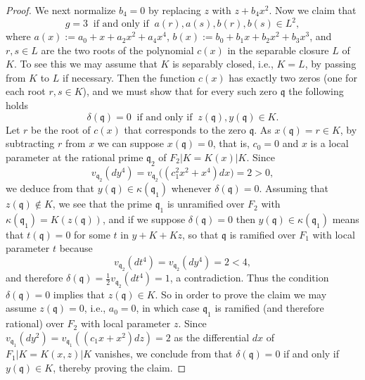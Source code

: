 \documentclass[12pt,reqno]{amsart}
\newcommand{\todoo}[2][]{\todo[size=tiny, #1]{#2}} %
\theoremstyle{definition}
\newcommand{\pp}{\mathfrak{p}}
\newcommand{\fq}{\mathfrak{q}}
\newcommand{\de}{\delta}
\newcommand{\ka}{\kappa}
\begin{document}
\begin{proof}



We next normalize $b_4=0$ by replacing $z$ with $z+ b_4 x^2$. 
Now we claim that
\[ g=3 \ \text{ if and only if } \ a(r),a(s),b(r),b(s)\in L^2,\]
where $a(x) := a_0 + x + a_2 x^2 + a_4 x^4$, $b(x) := b_0 + b_1 x + b_2 x^2 + b_3 x^3$, and $r,s \in L$ are the two roots of the polynomial $c(x)$ in the separable closure $L$ of $K$.
To see this we may assume that $K$ is separably closed, i.e., $K=L$, by passing from $K$ to $L$ if necessary.
Then the function $c(x)$ has exactly two zeros (one for each root $r,s \in K$), and we must show that for every such zero $\fq$ the following holds
\[ \de(\fq)=0 \ \text{ if and only if } \ z(\fq),y(\fq)\in K. \]
Let $r$ be the root of $c(x)$ that corresponds to the zero $\fq$.
As $x(\fq) = r \in K$, by subtracting $r$ from $x$ we can suppose $x(\fq)=0$,
that is, $c_0 = 0$ and $x$ is a local parameter at the rational prime $\fq_2$ of $F_2|K=K(x)|K$.
Since 
\[ v_{\fq_2}(d y^4) = v_{\fq_2}\big( (c_1^2 x^2 + x^4)dx \big) = 2 > 0, \]
we deduce from \cite[Theorem~2.3]{BedSt87} that $y(\fq)\in \ka(\fq_1)$ whenever $\de(\fq)=0$.
Assuming that $z(\fq)\notin K$, we see that the prime $\fq_1$ is unramified over $F_2$ with $\ka({\fq_1}) = K(z(\fq))$, and if we suppose $\de(\fq)=0$ then $y(\fq)\in \ka({\fq_1})$ means that 
$t(\fq)=0$ for some $t$ in $y + K + Kz$,
so that $\fq$ is ramified over $F_1$ with local parameter $t$ because
\[ v_{\fq_2}(dt^4) = v_{\fq_2}(dy^4) = 2 < 4, \]
and therefore $\de(\fq)=\frac12 v_{\fq_2}(dt^4)=1$, a contradiction.
Thus the condition $\de(\fq)=0$ implies that $z(\fq)\in K$.
So in order to prove the claim we may assume $z(\fq)=0$, i.e., $a_0 = 0$,
in which case $\fq_1$ is ramified (and therefore rational) over $F_2$ with local parameter $z$.
Since $v_{\fq_1}(dy^2)=v_{\fq_1}((c_1 x + x^2)dz)=2$ as the differential $dx$ of $F_1|K = K(x,z)|K$ vanishes, we conclude from \cite[Proposition~4.1]{BedSt87} that $\de(\fq) = 0$ if and only if $y(\fq)\in K$, thereby proving the claim.


\end{proof}
\end{document}

